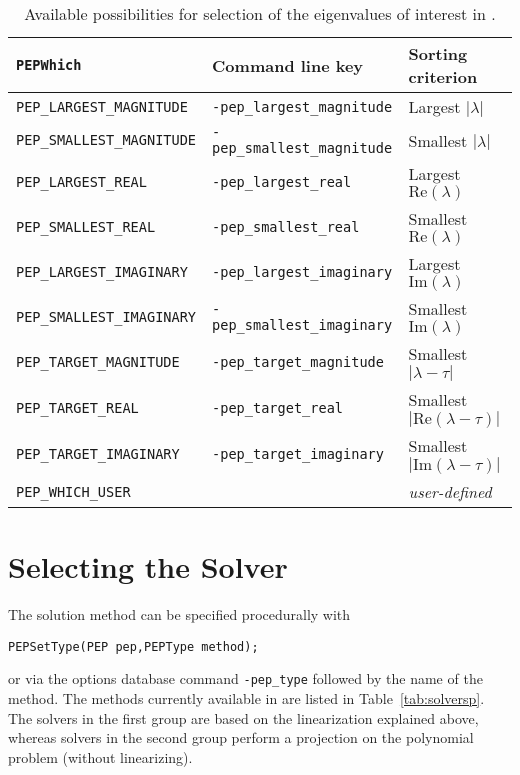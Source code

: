 \begin{table}
\centering
{\small \begin{tabular}{lll}
\texttt{PEPWhich}                  & Command line key                   & Sorting criterion \\\hline
\texttt{PEP\_LARGEST\_MAGNITUDE}   & \texttt{-pep\_largest\_magnitude}  & Largest $|\lambda|$ \\
\texttt{PEP\_SMALLEST\_MAGNITUDE}  & \texttt{-pep\_smallest\_magnitude} & Smallest $|\lambda|$ \\
\texttt{PEP\_LARGEST\_REAL}        & \texttt{-pep\_largest\_real}       & Largest $\mathrm{Re}(\lambda)$ \\
\texttt{PEP\_SMALLEST\_REAL}       & \texttt{-pep\_smallest\_real}      & Smallest $\mathrm{Re}(\lambda)$ \\
\texttt{PEP\_LARGEST\_IMAGINARY}   & \texttt{-pep\_largest\_imaginary}  & Largest $\mathrm{Im}(\lambda)$\footnotemark[1] \\
\texttt{PEP\_SMALLEST\_IMAGINARY}  & \texttt{-pep\_smallest\_imaginary} & Smallest $\mathrm{Im}(\lambda)$\footnotemark[1] \\\hline
\texttt{PEP\_TARGET\_MAGNITUDE}    & \texttt{-pep\_target\_magnitude}   & Smallest $|\lambda-\tau|$ \\
\texttt{PEP\_TARGET\_REAL}         & \texttt{-pep\_target\_real}        & Smallest $|\mathrm{Re}(\lambda-\tau)|$ \\
\texttt{PEP\_TARGET\_IMAGINARY}    & \texttt{-pep\_target\_imaginary}   & Smallest $|\mathrm{Im}(\lambda-\tau)|$ \\\hline
\texttt{PEP\_WHICH\_USER}          &                                    & \emph{user-defined} \\\hline
\end{tabular} }
\caption{\label{tab:portionq}Available possibilities for selection of the eigenvalues of interest in .}
\end{table}


\section{Selecting the Solver}

The solution method can be specified procedurally with
	\begin{Verbatim}[fontsize=\small]
	PEPSetType(PEP pep,PEPType method);
	\end{Verbatim}
or via the options database command \Verb!-pep_type! followed by the name of the method. The methods currently available in  are listed in Table~\ref{tab:solversp}. The solvers in the first group are based on the linearization explained above, whereas solvers in the second group perform a projection on the polynomial problem (without linearizing).

